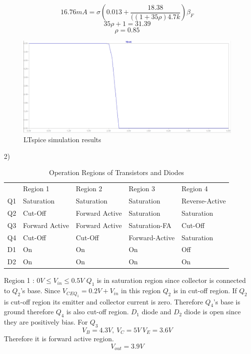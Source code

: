 \documentclass[11 pt]{article}
\begin{document}
$$16.76mA = \sigma(0.013+\frac{18.38}{((1+35\rho )4.7k})\beta_F$$
$$35\rho+1=31.39$$
$$\rho=0.85$$


\begin{figure}[H]
  \includegraphics[width=\linewidth]{aa}
  \caption{LTspice simulation results}
  \label{fig:zero}
\end{figure}

2)

\begin{table}[H]
\centering
\caption{Operation Regions of Transistors and Diodes}
\label{my-label}
\begin{tabular}{lllll}
   & Region 1   & Region 2       & Region 3       & Region 4       \\
Q1 & Saturation & Saturation     & Saturation     & Reverse-Active \\
Q2 & Cut-Off    & Forward Active & Saturation
 & Saturation     \\
Q3 & Forward Active & Forward Active    & Saturation-FA     & Cut-Off        \\
Q4 & Cut-Off    & Cut-Off        & Forward-Active & Saturation     \\
D1 & On         & On             & On             & Off            \\
D2 & On         & On             & On             & On            
\end{tabular}
\end{table}




Region 1 : $0 V \leq V_{in} \leq 0.5 V$
$Q_1$ is in saturation region since collector is connected to $Q_2$'s base. Since $V_{CEQ_1}=0.2V+V_{in}$ in this region $Q_2$ is in cut-off region. If $Q_2$ is cut-off region its emitter and collector current is zero. Therefore  $Q_4$'s base is ground therefore $Q_4$ is also cut-off region. $D_1$ diode and $D_2$ diode is open since they are positively bias. For $Q_3$ 
$$V_B=4.3V, \> V_C=5V \> V_E=3.6V$$
Therefore it is forward active region.
$$V_{out}=3.9V$$
\end{document}
